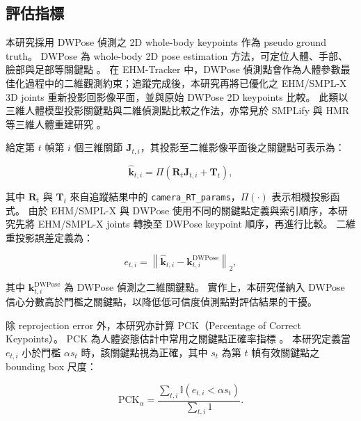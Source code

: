\documentclass[class=NCU_thesis, crop=false]{standalone}
\begin{document}
\subsection{評估指標}

本研究採用 DWPose 偵測之 2D whole-body keypoints 作為 pseudo ground truth。
DWPose 為 whole-body 2D pose estimation 方法，可定位人體、手部、臉部與足部等關鍵點 \cite{yang2023dwpose}。
在 EHM-Tracker 中，DWPose 偵測點會作為人體參數最佳化過程中的二維觀測約束；追蹤完成後，本研究再將已優化之 EHM/SMPL-X 3D joints 重新投影回影像平面，並與原始 DWPose 2D keypoints 比較。
此類以三維人體模型投影關鍵點與二維偵測點比較之作法，亦常見於 SMPLify 與 HMR 等三維人體重建研究 \cite{bogo2016smplify,kanazawa2018hmr}。

給定第 $t$ 幀第 $i$ 個三維關節 $\mathbf{J}_{t,i}$，其投影至二維影像平面後之關鍵點可表示為：

\begin{equation}
    \hat{\mathbf{k}}_{t,i}
    =
    \Pi(\mathbf{R}_{t}\mathbf{J}_{t,i} + \mathbf{T}_{t}),
    \label{eq:reprojection_projection}
\end{equation}

其中 $\mathbf{R}_{t}$ 與 $\mathbf{T}_{t}$ 來自追蹤結果中的 \texttt{camera\_RT\_params}，$\Pi(\cdot)$ 表示相機投影函式。
由於 EHM/SMPL-X 與 DWPose 使用不同的關鍵點定義與索引順序，本研究先將 EHM/SMPL-X joints 轉換至 DWPose keypoint 順序，再進行比較。
二維重投影誤差定義為：

\begin{equation}
    e_{t,i}
    =
    \left\|
    \hat{\mathbf{k}}_{t,i}
    -
    \mathbf{k}^{\mathrm{DWPose}}_{t,i}
    \right\|_{2},
    \label{eq:reprojection_error}
\end{equation}

其中 $\mathbf{k}^{\mathrm{DWPose}}_{t,i}$ 為 DWPose 偵測之二維關鍵點。
實作上，本研究僅納入 DWPose 信心分數高於門檻之關鍵點，以降低低可信度偵測點對評估結果的干擾。

除 reprojection error 外，本研究亦計算 PCK（Percentage of Correct Keypoints）。
PCK 為人體姿態估計中常用之關鍵點正確率指標 \cite{toshev2014deeppose}。
本研究定義當 $e_{t,i}$ 小於門檻 $\alpha s_t$ 時，該關鍵點視為正確，其中 $s_t$ 為第 $t$ 幀有效關鍵點之 bounding box 尺度：

\begin{equation}
    \mathrm{PCK}_{\alpha}
    =
    \frac{
    \sum_{t,i} \mathbb{I}(e_{t,i} < \alpha s_t)
    }{
    \sum_{t,i} 1
    }.
    \label{eq:pck}
\end{equation}
\end{document}
